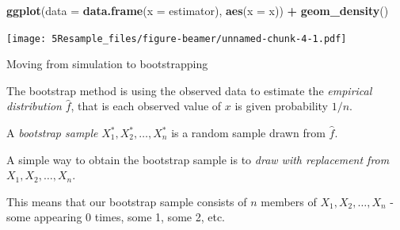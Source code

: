 \documentclass[10pt,ignorenonframetext,]{beamer}
\newenvironment{Shaded}{\begin{snugshade}}{\end{snugshade}}
\newcommand{\KeywordTok}[1]{\textcolor[rgb]{0.13,0.29,0.53}{\textbf{#1}}}
\newcommand{\DataTypeTok}[1]{\textcolor[rgb]{0.13,0.29,0.53}{#1}}
\newcommand{\StringTok}[1]{\textcolor[rgb]{0.31,0.60,0.02}{#1}}
\newcommand{\OperatorTok}[1]{\textcolor[rgb]{0.81,0.36,0.00}{\textbf{#1}}}
\newcommand{\NormalTok}[1]{#1}
\begin{document}
\begin{frame}[fragile]

\begin{Shaded}
\begin{Highlighting}[]
\KeywordTok{ggplot}\NormalTok{(}\DataTypeTok{data =} \KeywordTok{data.frame}\NormalTok{(}\DataTypeTok{x =}\NormalTok{ estimator), }\KeywordTok{aes}\NormalTok{(}\DataTypeTok{x =}\NormalTok{ x)) }\OperatorTok{+}\StringTok{ }\KeywordTok{geom_density}\NormalTok{()}
\end{Highlighting}
\end{Shaded}

\texttt{[image: 5Resample\_files/figure-beamer/unnamed-chunk-4-1.pdf]}

\end{frame}

\begin{frame}

\begin{block}{Moving from simulation to bootstrapping}

The bootstrap method is using the observed data to estimate the
\emph{empirical distribution} \(\hat{f}\), that is each observed value
of \(x\) is given probability \(1/n\).

A \emph{bootstrap sample} \(X^*_1,X^*_2,\ldots, X^*_n\) is a random
sample drawn from \(\hat{f}\).

A simple way to obtain the bootstrap sample is to \emph{draw with
replacement from \(X_1, X_2, \ldots, X_n\)}.

This means that our bootstrap sample consists of \(n\) members of
\(X_1, X_2, \ldots, X_n\) - some appearing 0 times, some 1, some 2, etc.

\end{block}

\end{frame}
\end{document}
